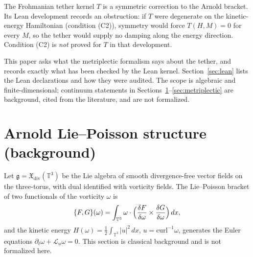 \documentclass[11pt,a4paper]{article}
\begin{document}
The Frohmanian tether kernel \(T\) \cite{Frohman2026} is a symmetric correction to the Arnold
bracket. Its Lean development records an obstruction: if \(T\) were degenerate on the kinetic-energy
Hamiltonian (condition (C2)), symmetry would force \(T(H,M)=0\) for every \(M\), so the tether
would supply no damping along the energy direction. Condition (C2) is \emph{not} proved for \(T\)
in that development.

This paper asks what the metriplectic formalism says about the tether, and records exactly what has
been checked by the Lean kernel. Section~\ref{sec:lean} lists the Lean declarations and how they were
audited. The scope is algebraic and finite-dimensional; continuum statements in
Sections~\ref{sec:arnold}--\ref{sec:metriplectic} are background, cited from the literature, and are not
formalized.

\section{Arnold Lie--Poisson structure (background)}\label{sec:arnold}
Let \(\mathfrak{g} = \mathfrak{X}_{\mathrm{div}}(\mathbb{T}^3)\) be the Lie algebra of smooth
divergence-free vector fields on the three-torus, with dual identified with vorticity fields. The
Lie--Poisson bracket of two functionals of the vorticity \(\omega\) is
\begin{equation}
\{F,G\}(\omega) = \int_{\mathbb{T}^3} \omega \cdot \Bigl(
\frac{\delta F}{\delta\omega}\times\frac{\delta G}{\delta\omega}\Bigr)\,dx,
\end{equation}
and the kinetic energy \(H(\omega) = \frac12\int_{\mathbb{T}^3}|u|^2\,dx\), \(u = \mathrm{curl}^{-1}\omega\),
generates the Euler equations \(\partial_t\omega + \mathcal{L}_u\omega = 0\). This section is
classical background and is not formalized here.
\end{document}
